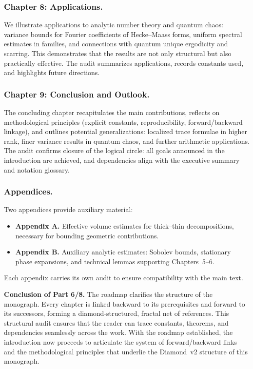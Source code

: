 \subsubsection*{Chapter 8: Applications.}
We illustrate applications to analytic number theory and quantum chaos:
variance bounds for Fourier coefficients of Hecke–Maass forms,
uniform spectral estimates in families, and connections with quantum unique ergodicity and scarring.
This demonstrates that the results are not only structural but also practically effective.
The audit summarizes applications, records constants used, and highlights future directions.

\subsubsection*{Chapter 9: Conclusion and Outlook.}
The concluding chapter recapitulates the main contributions,
reflects on methodological principles (explicit constants, reproducibility, forward/backward linkage),
and outlines potential generalizations: localized trace formulae in higher rank,
finer variance results in quantum chaos, and further arithmetic applications.
The audit confirms closure of the logical circle: all goals announced in the introduction
are achieved, and dependencies align with the executive summary and notation glossary.

\subsubsection*{Appendices.}
Two appendices provide auxiliary material:
\begin{itemize}
  \item \textbf{Appendix A.} Effective volume estimates for thick–thin decompositions, 
  necessary for bounding geometric contributions.
  \item \textbf{Appendix B.} Auxiliary analytic estimates: Sobolev bounds, stationary phase expansions,
  and technical lemmas supporting Chapters~5–6.
\end{itemize}
Each appendix carries its own audit to ensure compatibility with the main text.

\medskip

\noindent\textbf{Conclusion of Part 6/8.}
The roadmap clarifies the structure of the monograph. 
Every chapter is linked backward to its prerequisites and forward to its successors, 
forming a diamond-structured, fractal net of references. 
This structural audit ensures that the reader can trace constants, theorems, and dependencies seamlessly across the work.
With the roadmap established, the introduction now proceeds to articulate
the system of forward/backward links and the methodological principles
that underlie the Diamond~v2 structure of this monograph.

